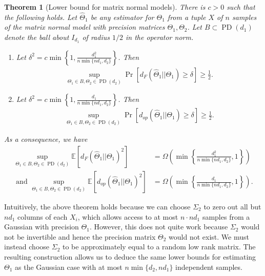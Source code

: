 \documentclass[aos]{imsart}
\newtheorem{theorem}{Theorem}[section]
\theoremstyle{definition}
\numberwithin{equation}{section}
\DeclareMathOperator{\PD}{PD}
\newcommand{\htheta}{\widehat{\Theta}}
\newcommand{\E}{\mathbb{E}}
\begin{document}
\begin{theorem}[Lower bound for matrix normal models]\label{thm:matrix-lower}
There is $c > 0$ such that the following holds. Let $\htheta_1$ be any estimator for $\Theta_1$ from a tuple $X$ of $n$ samples of the matrix normal model with precision matrices $\Theta_1, \Theta_2$. Let $B\subset \PD(d_1)$ denote the ball about $I_{d_1}$ of radius $1/2$ in the operator norm.
\begin{enumerate}
\item \label{it:frob-lower} Let $\delta^2 = c\min \left\{1,\frac{d_1^2}{n \min \{n d_1, d_2\}}\right\}$. Then
\begin{align}
\sup_{\Theta_1 \in B, \Theta_2 \in \PD(d_2)} \Pr\left[ d_F(\htheta_1|| \Theta_1)  \geq \delta\right] \geq \frac{1}{2}.
\end{align}
\item\label{it:op-lower} Let $\delta^2 = c\min \left\{1,\frac{d_1}{n \min \{n d_1, d_2\}}\right\}$. Then
 \begin{align}
\sup_{\Theta_1 \in B, \Theta_2 \in \PD(d_2)} \Pr\left[ d_{op}(\htheta_1|| \Theta_1) \geq \delta\right] \geq \frac{1}{2}. \label{eq:dop-lower-matrix-normal}
\end{align}
\end{enumerate}
As a consequence, we have 
\begin{align*}\sup_{\Theta_1 \in B, \Theta_2 \in \PD(d_2)}\E[d_F(\htheta_1|| \Theta_1)^2] &=\Omega\left( \min \left\{\frac{d_1^2}{n \min \{n d_1, d_2\}},1\right\}\right)\\
\text{ and } \sup_{\Theta_1 \in B, \Theta_2 \in \PD(d_2)}\E[d_{op}(\htheta_1|| \Theta_1)^2] &= \Omega\left( \min \left\{\frac{d_1}{n \min \{n d_1, d_2\}},1\right\}\right).\end{align*}
\end{theorem}

Intuitively, the above theorem holds because we can choose $\Sigma_2$ to zero out all but $nd_1$ columns of each $X_i$, which allows access to at most $n \cdot n d_1$ samples from a Gaussian with precision $\Theta_1$. However, this does not quite work because $\Sigma_2$ would not be invertible and hence the precision matrix $\Theta_2$ would not exist. We must instead choose $\Sigma_2$ to be approximately equal to a random low rank matrix. The resulting construction allows us to deduce the same lower bounds for estimating $\Theta_1$ as the Gaussian case with at most $n\min \{d_2, n d_1\}$ independent samples.
\end{document}
